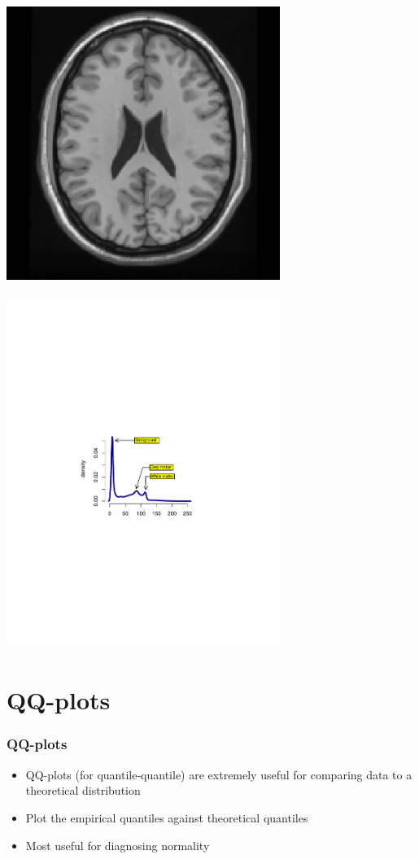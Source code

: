 \documentclass[aspectratio=169]{beamer}
\begin{document}
\begin{frame}
\includegraphics[width=3.5in]{brain.pdf}
\end{frame}

\begin{frame}
\includegraphics[width=3.5in]{brainDensityWithAnnotation.pdf}
\end{frame}

\section{QQ-plots}
\begin{frame}\frametitle{QQ-plots}
\begin{itemize}
\item QQ-plots (for quantile-quantile) are extremely useful
  for comparing data to a theoretical distribution
\item Plot the empirical quantiles against theoretical quantiles
\item Most useful for diagnosing normality
\end{itemize}
\end{frame}
\end{document}

